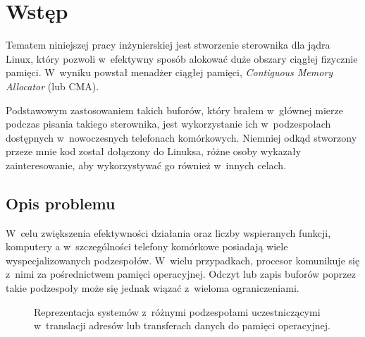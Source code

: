 \chapter{Wstęp}

Tematem niniejszej pracy inżynierskiej jest stworzenie sterownika dla
jądra Linux, który pozwoli w~efektywny sposób alokować duże obszary
ciągłej fizycznie pamięci.  W~wyniku powstał menadżer ciągłej pamięci,
{\it Contiguous Memory Allocator} (lub CMA).

Podstawowym zastosowaniem takich buforów, który brałem w~głównej
mierze podczas pisania takiego sterownika, jest wykorzystanie ich
w~podzespołach dostępnych w~nowoczesnych telefonach komórkowych.
Niemniej odkąd stworzony przeze mnie kod został dołączony do Linuksa,
różne osoby wykazały zainteresowanie, aby wykorzystywać go również
w~innych celach.


\section{Opis problemu}

W~celu zwiększenia efektywności działania oraz liczby wspieranych
funkcji, komputery a w~szczególności telefony komórkowe posiadają
wiele wyspecjalizowanych podzespołów.  W~wielu przypadkach, procesor
komunikuje się z~nimi za pośrednictwem pamięci operacyjnej.  Odczyt
lub zapis buforów poprzez takie podzespoły może się jednak wiązać
z~wieloma ograniczeniami.

\begin{figure}[tbp]
  \centering
   \qquad
  \qquad
  \caption{Reprezentacja systemów z~różnymi podzespołami
    uczestniczącymi w~translacji adresów lub transferach danych do
    pamięci operacyjnej.}
  \label{fig:mmu-iommu}
\end{figure}

